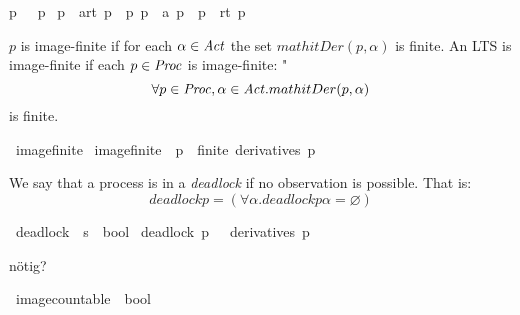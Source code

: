 \begin{isabellebody}
{\isacartoucheopen}p\ {\isasymmapsto}{\isachardollar}{\kern0pt}\ {\isacharbrackleft}{\kern0pt}{\isacharbrackright}{\kern0pt}\ p{\isacartoucheclose}\ {\isacharbar}{\kern0pt}\isanewline
{\isacartoucheopen}p\ {\isasymmapsto}{\isachardollar}{\kern0pt}\ {\isacharparenleft}{\kern0pt}a{\isacharhash}{\kern0pt}rt{\isacharparenright}{\kern0pt}\ p{\isacharprime}{\kern0pt}{\isacharprime}{\kern0pt}{\isacartoucheclose}\ \ {\isacartoucheopen}{\isasymexists}p{\isacharprime}{\kern0pt}{\isachardot}{\kern0pt}\ p\ {\isasymmapsto}\ a\ p{\isacharprime}{\kern0pt}\ {\isasymand}\ p{\isacharprime}{\kern0pt}\ {\isasymmapsto}{\isachardollar}{\kern0pt}\ rt\ p{\isacharprime}{\kern0pt}{\isacharprime}{\kern0pt}{\isacartoucheclose}%
\begin{isamarkuptext}%
$p$ is image-finite if for each $\alpha \in \mathit{Act}$ the set $mathit{Der} (p, \alpha)$ is finite.
An LTS is image-finite if each $p \in \mathit{Proc}$ is image-finite:
"$$\forall p \in\mathit{Proc}, \alpha \in \mathit{Act}. mathit{Der} (p, \alpha)$$ is finite.%
\end{isamarkuptext}\isamarkuptrue%
\isamarkupfalse%
\ image{\isacharunderscore}{\kern0pt}finite\ \isanewline
{\isacartoucheopen}image{\isacharunderscore}{\kern0pt}finite\ {\isasymequiv}\ {\isacharparenleft}{\kern0pt}{\isasymforall}p\ {\isasymalpha}{\isachardot}{\kern0pt}\ finite\ {\isacharparenleft}{\kern0pt}derivatives\ p\ {\isasymalpha}{\isacharparenright}{\kern0pt}{\isacharparenright}{\kern0pt}{\isacartoucheclose}%
\begin{isamarkuptext}%
We say that a process is in a \textit{deadlock} if no observation is possible. That is:
$$\mathit{deadlock} p = (\forall\alpha .\mathit{deadlock} p \alpha = \varnothing)$$%
\end{isamarkuptext}\isamarkuptrue%
\isamarkupfalse%
\ deadlock\ {\isacharcolon}{\kern0pt}{\isacharcolon}{\kern0pt}\ {\isacartoucheopen}{\isacharprime}{\kern0pt}s\ {\isasymRightarrow}\ bool{\isacartoucheclose}\ \isanewline
{\isacartoucheopen}deadlock\ p\ {\isasymequiv}\ {\isacharparenleft}{\kern0pt}{\isasymforall}{\isasymalpha}{\isachardot}{\kern0pt}\ derivatives\ p\ {\isasymalpha}\ {\isacharequal}{\kern0pt}\ {\isacharbraceleft}{\kern0pt}{\isacharbraceright}{\kern0pt}{\isacharparenright}{\kern0pt}{\isacartoucheclose}%
\begin{isamarkuptext}%
nötig?%
\end{isamarkuptext}\isamarkuptrue%
\isamarkupfalse%
\ image{\isacharunderscore}{\kern0pt}countable\ {\isacharcolon}{\kern0pt}{\isacharcolon}{\kern0pt}\ {\isacartoucheopen}bool{\isacartoucheclose}\isanewline

\end{isabellebody}
